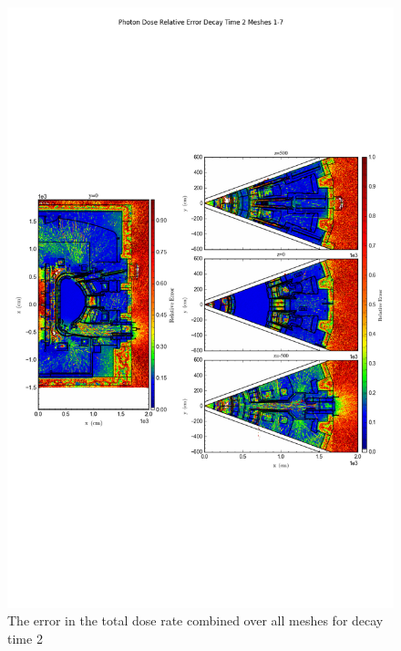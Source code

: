 \documentclass[12pt]{article}
\begin{document}
\begin{figure}[ht!]
\centering
\includegraphics[trim={0cm 9cm 0cm 10cm},clip,scale=0.75]{../plots/final_model/Photon_Dose_Relative_Error_Decay_Time_2_Meshes_1-7.png}
\caption{The error in the total dose rate combined over all meshes for decay time 2}
\label{fig:photons_dc2_no4bc_total_error}
\end{figure}
\end{document}
